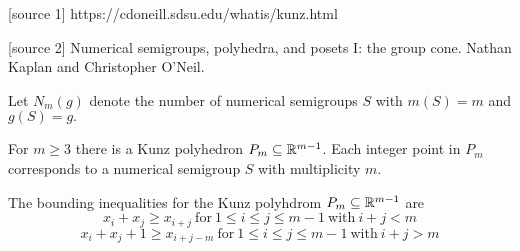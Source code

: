 [source 1] https://cdoneill.sdsu.edu/whatis/kunz.html

[source 2] Numerical semigroups, polyhedra, and posets I: the group cone. Nathan Kaplan and Christopher O'Neil. 

Let $N_m(g)$ denote the number of numerical semigroups $S$ with $m(S) = m$ and $g(S) = g.$

For $m \geq 3$ there is a Kunz polyhedron $P_m \subseteq \mathbb{R}^{m-1}$. Each integer point in $P_m$ corresponds to a numerical semigroup $S$ with multiplicity $m$. 

The bounding inequalities for the Kunz polyhdrom $P_m \subseteq \mathbb{R}^{m-1}$ are 
$$x_i + x_j \geq x_{i+j} \ \text{for} \ 1 \leq i \leq j \leq m - 1 \ \text{with} \ i + j < m$$
$$x_i + x_j + 1 \geq x_{i+j-m} \ \text{for} \ 1 \leq i \leq j \leq m - 1 \ \text{with} \ i + j > m$$